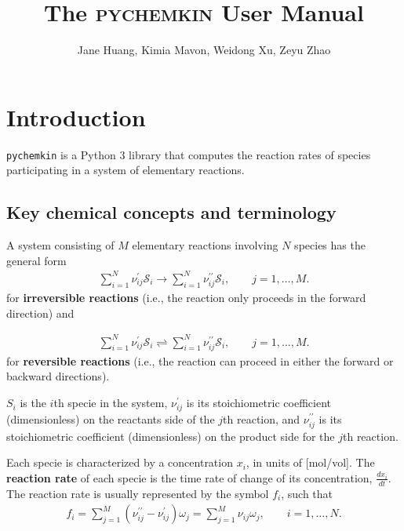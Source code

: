 \documentclass[12pt]{article}
\begin{document}
\title{The \textsc{pychemkin} User Manual}
\author{Jane Huang, Kimia Mavon, Weidong Xu, Zeyu Zhao}
\date{}
\maketitle
\section{Introduction}


{\tt pychemkin} is a Python 3 library that computes the reaction rates of species participating in a system of elementary reactions.

\subsection{Key chemical concepts and terminology}

A system consisting of $M$ elementary reactions involving $N$ species has the general form
\begin{align}
  \sum_{i=1}^{N}{\nu_{ij}^{\prime}\mathcal{S}_{i}} \longrightarrow
  \sum_{i=1}^{N}{\nu_{ij}^{\prime\prime}\mathcal{S}_{i}}, \qquad j = 1, \ldots, M.
\end{align}
for \textbf{irreversible reactions} (i.e., the reaction only proceeds in the forward direction) and 

\begin{align}
  \sum_{i=1}^{N}{\nu_{ij}^{\prime}\mathcal{S}_{i}} \rightleftharpoons
  \sum_{i=1}^{N}{\nu_{ij}^{\prime\prime}\mathcal{S}_{i}}, \qquad j = 1, \ldots, M.
\end{align}
for \textbf{reversible reactions} (i.e., the reaction can proceed in either the forward or backward directions). 

$S_i$ is the $i$th specie in the system, $\nu_{ij}^{\prime}$ is its stoichiometric coefficient (dimensionless) on the reactants side of the $j$th reaction, and $\nu_{ij}^{\prime\prime}$ is its stoichiometric coefficient (dimensionless) on the product side for the $j$th reaction.

Each specie is characterized by a concentration $x_i$, in units of [mol/vol].
The \textbf{reaction rate} of each specie is the time rate of change of its concentration, $\frac{dx_i}{dt}$. The reaction rate is usually represented by the symbol $f_i$, such that
\begin{align}
  f_{i} = \sum_{j=1}^{M}{(\nu_{ij}^{\prime\prime}-\nu_{ij}^\prime)\omega_{j}}= \sum_{j=1}^{M}{\nu_{ij}\omega_{j}}, \qquad i = 1, \ldots, N.
\end{align}
\end{document}

